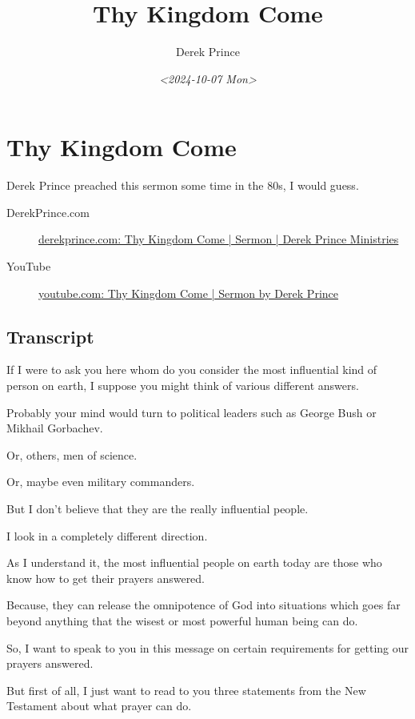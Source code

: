 \documentclass[11pt]{article}
\author{Derek Prince}
\date{\textit{<2024-10-07 Mon>}}
\title{Thy Kingdom Come}
\begin{document}
\maketitle

\section{Thy Kingdom Come}
\label{sec:org62c2dc0}

Derek Prince preached this sermon some time in the 80s, I would guess.

\begin{description}
\item[{DerekPrince.com}] \href{https://www.derekprince.com/sermons/409}{derekprince.com: Thy Kingdom Come | Sermon | Derek Prince Ministries}

\item[{YouTube}] \href{https://www.youtube.com/watch?v=9L-ZM0g6yf0}{youtube.com: Thy Kingdom Come | Sermon by Derek Prince}
\end{description}

\subsection{Transcript}
\label{sec:org34b7ee3}

If I were to ask you here whom do you consider
the most influential kind of person on earth,
I suppose you might think of various different
answers.

Probably your mind would turn to political
leaders such as George Bush or Mikhail
Gorbachev.

Or, others, men of science.

Or, maybe even military commanders.

But I don't believe that they are the really
influential people.

I look in a completely different direction.

As I understand it, the most influential
people on earth today are those who know how
to get their prayers answered.

Because, they can release the omnipotence of
God into situations which goes far beyond
anything that the wisest or most powerful
human being can do.

So, I want to speak to you in this message on
certain requirements for getting our prayers
answered.

But first of all, I just want to read to you
three statements from the New Testament about
what prayer can do.
\end{document}
